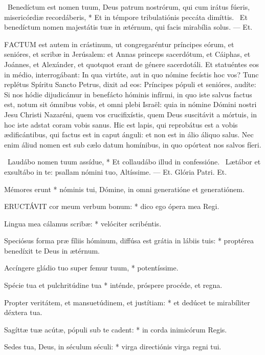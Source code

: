 \R\ Benedíctum est nomen tuum, Deus patrum nostrórum, qui cum irátus fúeris, misericórdiæ recordáberis, * Et in témpore tribulatiónis peccáta dimíttis. \V\ Et benedíctum nomen majestátis tuæ in ætérnum, qui facis mirabília solus. --- Et.


\lettrine[lines=2]{F}{ACTUM} est autem in crástinum, ut congregaréntur príncipes eórum, et senióres, et scribæ in Jerúsalem: et Annas princeps sacerdótum, et Cáiphas, et Joánnes, et Alexánder, et quotquot erant de génere sacerdotáli. Et statuéntes eos in médio, interrogábant: In qua virtúte, aut in quo nómine fecístis hoc vos? Tunc replétus Spíritu Sancto Petrus, dixit ad eos: Príncipes pópuli et senióres, audíte: Si nos hódie dijudicámur in benefácto hóminis infírmi, in quo iste salvus factus est, notum sit ómnibus vobis, et omni plebi Israël: quia in nómine Dómini nostri Jesu Christi Nazaréni, quem vos crucifixístis, quem Deus suscitávit a mórtuis, in hoc iste adstat coram vobis sanus. Hic est lapis, qui reprobátus est a vobis ædificántibus, qui factus est in caput ánguli: et non est in álio áliquo salus. Nec enim áliud nomen est sub cælo datum homínibus, in quo opórteat nos salvos fíeri.

\R\ Laudábo nomen tuum assídue, * Et collaudábo illud in confessióne. \V\ Lætábor et exsultábo in te: psallam nómini tuo, Altíssime. --- Et. Glória Patri. Et.


 Mémores erunt * nóminis tui, Dómine, in omni generatióne et generatiónem.


\lettrine[lines=2]{E}{RUCTÁVIT} cor meum verbum bonum: * dico ego ópera mea Regi.

Lingua mea cálamus scribæ: * velóciter scribéntis.

Speciósus forma præ fíliis hóminum, diffúsa est grátia in lábiis tuis: * proptérea benedíxit te Deus in ætérnum.

Accíngere gládio tuo super femur tuum, * potentíssime.

Spécie tua et pulchritúdine tua * inténde, próspere procéde, et regna.

Propter veritátem, et mansuetúdinem, et justítiam: * et dedúcet te mirabíliter déxtera tua.

Sagíttæ tuæ acútæ, pópuli sub te cadent: * in corda inimicórum Regis.

Sedes tua, Deus, in séculum séculi: * virga directiónis virga regni tui.

